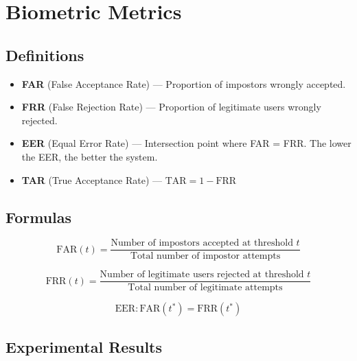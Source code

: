 \section{Biometric Metrics}

\subsection{Definitions}

\begin{infobox}
\begin{itemize}[nosep]
    \item \textbf{FAR} (False Acceptance Rate) — Proportion of impostors wrongly accepted.
    \item \textbf{FRR} (False Rejection Rate) — Proportion of legitimate users wrongly rejected.
    \item \textbf{EER} (Equal Error Rate) — Intersection point where FAR = FRR. The lower the EER, the better the system.
    \item \textbf{TAR} (True Acceptance Rate) — $\text{TAR} = 1 - \text{FRR}$
\end{itemize}
\end{infobox}

\subsection{Formulas}

\begin{equation}
    \text{FAR}(t) = \frac{\text{Number of impostors accepted at threshold } t}{\text{Total number of impostor attempts}}
\end{equation}

\begin{equation}
    \text{FRR}(t) = \frac{\text{Number of legitimate users rejected at threshold } t}{\text{Total number of legitimate attempts}}
\end{equation}

\begin{equation}
    \text{EER} : \text{FAR}(t^*) = \text{FRR}(t^*)
\end{equation}

\subsection{Experimental Results}

